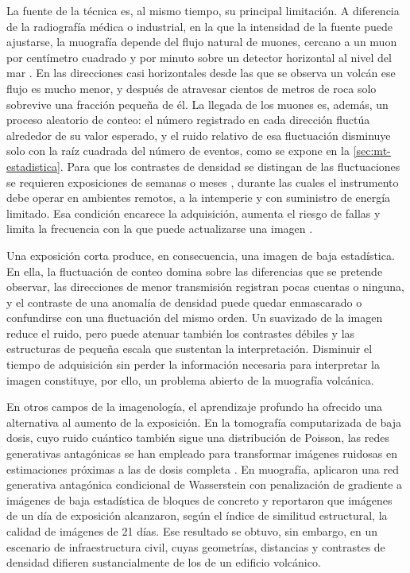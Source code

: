 La fuente de la técnica es, al mismo tiempo, su principal limitación. A diferencia de la radiografía médica o industrial, en la que la intensidad de la fuente puede ajustarse, la muografía depende del flujo natural de muones, cercano a un muon por centímetro cuadrado y por minuto sobre un detector horizontal al nivel del mar \parencite{pdg2022}. En las direcciones casi horizontales desde las que se observa un volcán ese flujo es mucho menor, y después de atravesar cientos de metros de roca solo sobrevive una fracción pequeña de él. La llegada de los muones es, además, un proceso aleatorio de conteo: el número registrado en cada dirección fluctúa alrededor de su valor esperado, y el ruido relativo de esa fluctuación disminuye solo con la raíz cuadrada del número de eventos, como se expone en la \cref{sec:mt-estadistica}. Para que los contrastes de densidad se distingan de las fluctuaciones se requieren exposiciones de semanas o meses \parencite{lesparre2010}, durante las cuales el instrumento debe operar en ambientes remotos, a la intemperie y con suministro de energía limitado. Esa condición encarece la adquisición, aumenta el riesgo de fallas y limita la frecuencia con la que puede actualizarse una imagen \parencite{bonomi2020,lechmann2021}.

Una exposición corta produce, en consecuencia, una imagen de baja estadística. En ella, la fluctuación de conteo domina sobre las diferencias que se pretende observar, las direcciones de menor transmisión registran pocas cuentas o ninguna, y el contraste de una anomalía de densidad puede quedar enmascarado o confundirse con una fluctuación del mismo orden. Un suavizado de la imagen reduce el ruido, pero puede atenuar también los contrastes débiles y las estructuras de pequeña escala que sustentan la interpretación. Disminuir el tiempo de adquisición sin perder la información necesaria para interpretar la imagen constituye, por ello, un problema abierto de la muografía volcánica.

En otros campos de la imagenología, el aprendizaje profundo ha ofrecido una alternativa al aumento de la exposición. En la tomografía computarizada de baja dosis, cuyo ruido cuántico también sigue una distribución de Poisson, las redes generativas antagónicas se han empleado para transformar imágenes ruidosas en estimaciones próximas a las de dosis completa \parencite{yang2018}. En muografía, \textcite{odonnell2025particles} aplicaron una red generativa antagónica condicional de Wasserstein con penalización de gradiente a imágenes de baja estadística de bloques de concreto y reportaron que imágenes de un día de exposición alcanzaron, según el índice de similitud estructural, la calidad de imágenes de 21 días. Ese resultado se obtuvo, sin embargo, en un escenario de infraestructura civil, cuyas geometrías, distancias y contrastes de densidad difieren sustancialmente de los de un edificio volcánico.

